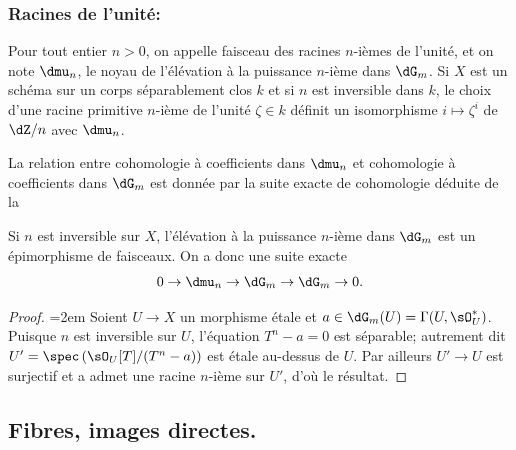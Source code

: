 \subsubsection{Racines de l'unité:}\label{I:2-2-4}

Pour tout entier $n>0$, on appelle faisceau des racines $n$-ièmes de 
l'unité, et on note $\dmu_n$, le noyau de l'élévation à la puissance 
$n$-ième dans $\dG_m$. Si $X$ est un schéma sur un corps séparablement 
clos $k$ et si $n$ est inversible dans $k$, le choix d'une racine primitive 
$n$-ième de l'unité $\zeta\in k$ définit un isomorphisme 
$i\mapsto \zeta^i$ de $\dZ/n$ avec $\dmu_n$. 

La relation entre cohomologie à coefficients dans $\dmu_n$ et cohomologie à 
coefficients dans $\dG_m$ est donnée par la suite exacte de cohomologie déduite 
de la 






\begin{sourcenameddash}\label{I:2-2-5}
Si $n$ est inversible sur $X$, l'élévation à la puissance $n$-ième dans 
$\dG_m$ est un épimorphisme de faisceaux. On a donc une suite exacte 
\[
  0 \to \dmu_n \to \dG_m \to \dG_m \to 0\text{.}
\]
\end{sourcenameddash}
\begin{proof}
\begingroup
\emergencystretch=2em\relax
Soient $U\to X$ un morphisme étale et $a\in \dG_m(U) =\Gamma(U,\sO_U^*)$. 
Puisque $n$ est inversible sur $U$, l'équation $T^n-a = 0$ est séparable; 
autrement dit $U'=\spec\left(\sO_U[T]/(T^n-a)\right)$ est étale au-dessus de 
$U$. Par ailleurs $U'\to U$ est surjectif et a admet une racine $n$-ième sur 
$U'$, d'où le résultat.\par
\endgroup 
\end{proof}










\subsection{Fibres, images directes.}\label{I:2-3}





\subsubsection{}\label{I:2-3-1}

